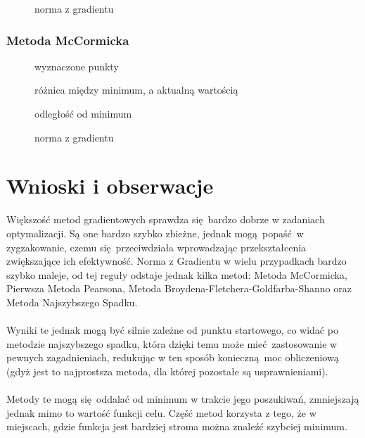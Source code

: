 \documentclass[a4paper, 10pt]{article}
\begin{document}
				\begin{figure}[H]
				  	\centering
				  	\def \svgwidth{0.75\columnwidth}
				  	
				  	\caption{norma z gradientu}
				\end{figure}\noindent		
			\subsubsection{Metoda McCormicka}
			    \begin{figure}[H]
			        \centering
			        \def \svgwidth{0.75\columnwidth}
			        
			        \caption{wyznaczone punkty}
			    \end{figure}\noindent
			
			
			    \begin{figure}[H]
			        \centering
			        \def \svgwidth{0.75\columnwidth}
			        
			        \caption{różnica między minimum, a aktualną wartością}
			    \end{figure}\noindent
			
			
			    \begin{figure}[H]
			        \centering
			        \def \svgwidth{0.75\columnwidth}
			        
			        \caption{odległość od minimum}
			    \end{figure}\noindent
				
			   \begin{figure}[H]
			    	\centering
			    	\def \svgwidth{0.75\columnwidth}
			    	
			    	\caption{norma z gradientu}
			   \end{figure}\noindent
	\section{Wnioski i obserwacje}
		Większość metod gradientowych sprawdza się bardzo dobrze w zadaniach optymalizacji. Są one bardzo szybko zbieżne, jednak mogą popaść w zygzakowanie, czemu się przeciwdziała wprowadzając przekształcenia zwiększające ich efektywność. Norma z Gradientu w wielu przypadkach bardzo szybko maleje, od tej reguły odstaje jednak kilka metod: Metoda McCormicka, Pierwsza Metoda Pearsona, Metoda Broydena-Fletchera-Goldfarba-Shanno oraz Metoda Najszybszego Spadku.
		\\
		\\
		Wyniki te jednak mogą być silnie zależne od punktu startowego, co widać po metodzie najszybszego spadku, która dzięki temu może mieć zastosowanie w pewnych zagadnieniach, redukując w ten sposób konieczną moc obliczeniową (gdyż jest to najprostsza metoda, dla której pozostałe są usprawnieniami).
		\\
		\\
		Metody te mogą się oddalać od minimum w trakcie jego poszukiwań, zmniejszają jednak mimo to wartość funkcji celu. Część metod korzysta z tego, że w miejscach, gdzie funkcja jest bardziej stroma można znaleźć szybciej minimum. 
\end{document}

